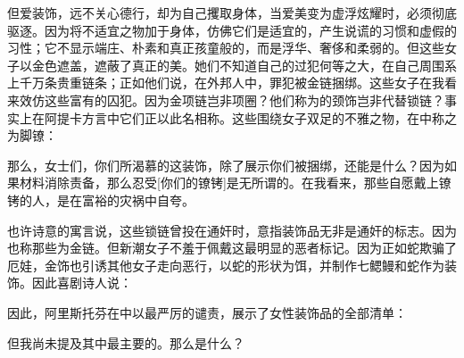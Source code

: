 \par

但爱装饰，远不关心德行，却为自己攫取身体，当爱美变为虚浮炫耀时，必须彻底驱逐。因为将不适宜之物加于身体，仿佛它们是适宜的，产生说谎的习惯和虚假的习性；它不显示端庄、朴素和真正孩童般的，而是浮华、奢侈和柔弱的。但这些女子以金色遮盖，遮蔽了真正的美。她们不知道自己的过犯何等之大，在自己周围系上千万条贵重链条；正如他们说，在外邦人中，罪犯被金链捆绑。这些女子在我看来效仿这些富有的囚犯。因为金项链岂非项圈？他们称为的颈饰岂非代替锁链？事实上在阿提卡方言中它们正以此名相称。这些围绕女子双足的不雅之物，在中称之为脚镣：\par

\par

那么，女士们，你们所渴慕的这装饰，除了展示你们被捆绑，还能是什么？因为如果材料消除责备，那么忍受[你们的镣铐]是无所谓的。在我看来，那些自愿戴上镣铐的人，是在富裕的灾祸中自夸。\par

也许诗意的寓言说，这些锁链曾投在通奸时，意指装饰品无非是通奸的标志。因为也称那些为金链。但新潮女子不羞于佩戴这最明显的恶者标记。因为正如蛇欺骗了厄娃，金饰也引诱其他女子走向恶行，以蛇的形状为饵，并制作七鳃鳗和蛇作为装饰。因此喜剧诗人说：\par

因此，阿里斯托芬在中以最严厉的谴责，展示了女性装饰品的全部清单：\par

\par

但我尚未提及其中最主要的。那么是什么？\par

\par

